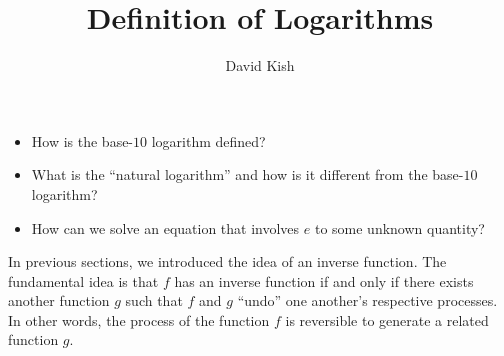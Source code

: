 \documentclass[nooutcomes]{ximera}
\author{David Kish}
\title{Definition of Logarithms}
\begin{document}
\begin{abstract}
  
\end{abstract}
\maketitle


%
%
%

\begin{motivatingQuestions}
\begin{itemize}
\item
How is the base-\(10\) logarithm defined?%
\item
What is the ``natural logarithm'' and how is it different from the base-\(10\) logarithm?%
\item
How can we solve an equation that involves \(e\) to some unknown quantity?%
\end{itemize}
\end{motivatingQuestions}

In previous sections, we introduced the idea of an inverse function.  The fundamental idea is that \(f\) has an inverse function if and only if there exists another function \(g\) such that \(f\) and \(g\) ``undo'' one another's respective processes.  In other words, the process of the function \(f\) is reversible to generate a related function \(g\).%
\end{document}

